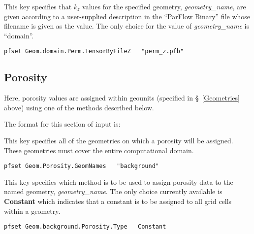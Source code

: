 {
This key specifies that $k_z$ values for the specified geometry,
{\em geometry\_name}, are given according to a user-supplied description
in the ``ParFlow Binary'' file whose filename is given as the value.
The only choice for the value of {\em geometry\_name} is ``domain''.
}
\begin{display}\begin{verbatim}
pfset Geom.domain.Perm.TensorByFileZ   "perm_z.pfb"
\end{verbatim}\end{display}




\subsection{Porosity}
\label{Porosity}

Here, porosity values are assigned within geounits (specified in
\S~\ref{Geometries} above) using one of the methods described below.

The format for this section of input is:

{
This key specifies all of the geometries on which a porosity will be 
assigned.  These geometries must cover the entire computational domain.
}
\begin{display}\begin{verbatim}
pfset Geom.Porosity.GeomNames   "background"
\end{verbatim}\end{display}

{
This key specifies which method is to be used to assign porosity data
to the named geometry, {\em geometry\_name}.  The only choice currently
available is {\bf Constant} which indicates that a constant is to be
assigned to all grid cells within a geometry.
}
\begin{display}\begin{verbatim}
pfset Geom.background.Porosity.Type   Constant
\end{verbatim}\end{display}

